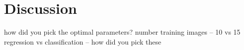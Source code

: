 \chapter{Discussion}

how did you pick the optimal parameters? 
number training images -- 10 vs 15
regression vs classification -- how did you pick these
